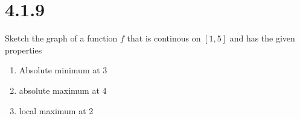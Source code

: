 \section*{4.1.9}
Sketch the graph of a function $f$ that is continous on $[1,5]$ and has the given properties

\begin{enumerate}
    \item Absolute minimum at 3
   \item absolute maximum at 4
    \item local maximum at 2
\end{enumerate}

